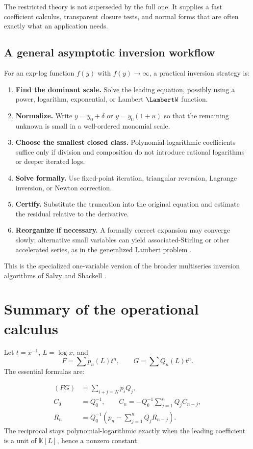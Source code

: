 \documentclass[11pt]{article}
\theoremstyle{pltheorem}
\newcommand{\K}{\mathbb K}
\begin{document}
The restricted theory is not superseded by the full one.  It supplies a fast coefficient calculus, transparent closure tests, and normal forms that are often exactly what an application needs.

\subsection{A general asymptotic inversion workflow}

For an exp-log function \(f(y)\) with \(f(y)\to\infty\), a practical inversion strategy is:
\begin{enumerate}
\item \textbf{Find the dominant scale.}  Solve the leading equation, possibly using a power, logarithm, exponential, or Lambert \(\LambertW\) function.
\item \textbf{Normalize.}  Write \(y=y_0+\delta\) or \(y=y_0(1+u)\) so that the remaining unknown is small in a well-ordered monomial scale.
\item \textbf{Choose the smallest closed class.}  Polynomial-logarithmic coefficients suffice only if division and composition do not introduce rational logarithms or deeper iterated logs.
\item \textbf{Solve formally.}  Use fixed-point iteration, triangular reversion, Lagrange inversion, or Newton correction.
\item \textbf{Certify.}  Substitute the truncation into the original equation and estimate the residual relative to the derivative.
\item \textbf{Reorganize if necessary.}  A formally correct expansion may converge slowly; alternative small variables can yield associated-Stirling or other accelerated series, as in the generalized Lambert problem \cite{jeffrey-et-al-1995}.
\end{enumerate}
This is the specialized one-variable version of the broader multiseries inversion algorithms of Salvy and Shackell \cite{salvy-shackell-1999}.

\section{Summary of the operational calculus}
\label{sec:summary}

Let \(t=x^{-1}\), \(L=\log x\), and
\[
 F=\sum p_n(L)t^n,
 \qquad
 G=\sum Q_n(L)t^n.
\]
The essential formulas are:

\begin{keybox}
\begin{align*}
 [t^N](FG)&=\sum_{i+j=N}p_iQ_j,\\
 C_0&=Q_0^{-1},\qquad
 C_n=-Q_0^{-1}\sum_{j=1}^nQ_jC_{n-j},\\
 R_n&=Q_0^{-1}\left(p_n-\sum_{j=1}^nQ_jR_{n-j}\right).
\end{align*}
The reciprocal stays polynomial-logarithmic exactly when the leading coefficient is a unit of \(\K[L]\), hence a nonzero constant.
\end{keybox}
\end{document}

